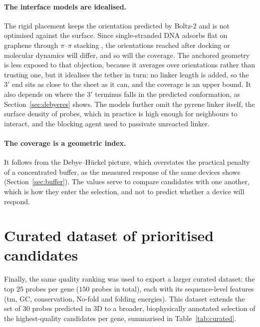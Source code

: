 \paragraph{The interface models are idealised.} The rigid placement keeps the orientation
predicted by Boltz-2 and is not optimised against the surface. Since single-stranded DNA adsorbs
flat on graphene through $\pi$--$\pi$ stacking \citep{green2015}, the orientations reached after
docking or molecular dynamics will differ, and so will the coverage. The anchored geometry is less
exposed to that objection, because it averages over orientations rather than trusting one, but it
idealises the tether in turn: no linker length is added, so the $3'$ end sits as close to the sheet
as it can, and the coverage is an upper bound. It also depends on where the $3'$ terminus falls in
the predicted conformation, as Section~\ref{sec:debyeres} shows. The models further omit the
pyrene linker itself, the surface density of probes, which in practice is high enough for
neighbours to interact, and the blocking agent used to passivate unreacted linker.

\paragraph{The coverage is a geometric index.} It follows from the Debye--H\"uckel picture, which
overstates the practical penalty of a concentrated buffer, as the measured response of the same
devices shows (Section~\ref{sec:buffer}). The values serve to compare candidates with one another,
which is how they enter the selection, and not to predict whether a device will respond.

\section{Curated dataset of prioritised candidates}

Finally, the same quality ranking was used to export a larger curated dataset: the top $25$
probes per gene ($150$ probes in total), each with its sequence-level features (\acrshort{tm},
GC, conservation, No-fold and folding energies). This dataset extends the set of $30$ probes
predicted in 3D to a broader, biophysically annotated selection of the highest-quality
candidates per gene, summarised in Table~\ref{tab:curated}.

